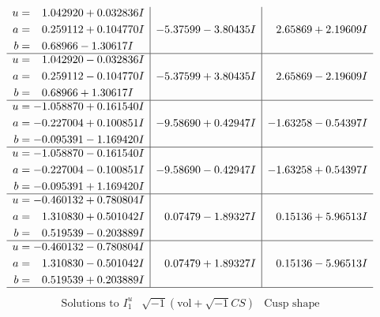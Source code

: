 \documentclass[1p]{elsarticle_modified}
\theoremstyle{definition}
\newcommand{\I}{\sqrt{-1}}
\begin{document}
$$\begin{array}{c|c|c}
\begin{aligned}
u &= \phantom{-}1.042920 + 0.032836 I \\
a &= \phantom{-}0.259112 + 0.104770 I \\
b &= \phantom{-}0.68966 - 1.30617 I\end{aligned}
 & -5.37599 - 3.80435 I & \phantom{-}2.65869 + 2.19609 I \\ \hline\begin{aligned}
u &= \phantom{-}1.042920 - 0.032836 I \\
a &= \phantom{-}0.259112 - 0.104770 I \\
b &= \phantom{-}0.68966 + 1.30617 I\end{aligned}
 & -5.37599 + 3.80435 I & \phantom{-}2.65869 - 2.19609 I \\ \hline\begin{aligned}
u &= -1.058870 + 0.161540 I \\
a &= -0.227004 + 0.100851 I \\
b &= -0.095391 - 1.169420 I\end{aligned}
 & -9.58690 + 0.42947 I & -1.63258 - 0.54397 I \\ \hline\begin{aligned}
u &= -1.058870 - 0.161540 I \\
a &= -0.227004 - 0.100851 I \\
b &= -0.095391 + 1.169420 I\end{aligned}
 & -9.58690 - 0.42947 I & -1.63258 + 0.54397 I \\ \hline\begin{aligned}
u &= -0.460132 + 0.780804 I \\
a &= \phantom{-}1.310830 + 0.501042 I \\
b &= \phantom{-}0.519539 - 0.203889 I\end{aligned}
 & \phantom{-}0.07479 - 1.89327 I & \phantom{-}0.15136 + 5.96513 I \\ \hline\begin{aligned}
u &= -0.460132 - 0.780804 I \\
a &= \phantom{-}1.310830 - 0.501042 I \\
b &= \phantom{-}0.519539 + 0.203889 I\end{aligned}
 & \phantom{-}0.07479 + 1.89327 I & \phantom{-}0.15136 - 5.96513 I\\
 \hline 
 \end{array}$$\newpage$$\begin{array}{c|c|c}  
\text{Solutions to }I^u_{1}& \I (\text{vol} + \sqrt{-1}CS) & \text{Cusp shape}\\

\end{array}$$
\end{document}

